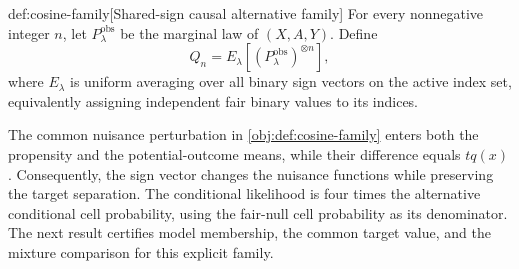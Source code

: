 \begin{definitionv}{def:cosine-family}[Shared-sign causal alternative family]
For every nonnegative integer \(n\), let \(P_\lambda^{\mathrm{obs}}\) be the marginal law of \((X,A,Y)\). Define
\[
Q_n=E_\lambda\!\left[(P_\lambda^{\mathrm{obs}})^{\otimes n}\right],
\]
where \(E_\lambda\) is uniform averaging over all binary sign vectors on the active index set, equivalently assigning independent fair binary values to its indices.
\end{definitionv}

The common nuisance perturbation in \cref{obj:def:cosine-family} enters both the propensity and the potential-outcome means, while their difference equals \(tq(x)\). Consequently, the sign vector changes the nuisance functions while preserving the target separation. The conditional likelihood  is four times the alternative conditional cell probability, using the fair-null cell probability as its denominator. The next result certifies model membership, the common target value, and the mixture comparison for this explicit family.

